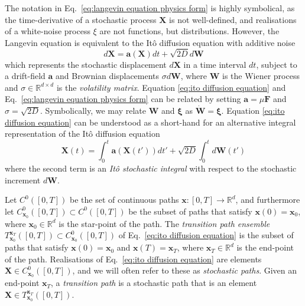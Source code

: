 The notation in Eq.~\ref{eq:langevin equation physics form} is highly symbolical, as the time-derivative of a stochastic process $\mathbf{X}$ is not well-defined, and realisations of a white-noise process $\xi$ are not functions, but distributions. However, the Langevin equation is equivalent to the It\^{o} diffusion equation with additive noise
\begin{equation} \label{eq:ito diffusion equation}
d \mathbf{X} = \mathbf{a}(\mathbf{X}) dt + \sqrt{2D} d \mathbf{W}
\end{equation}
which represents the stochastic displacement $d\mathbf{X}$ in a time
interval $dt$, subject to a drift-field $\mathbf{a}$ and Brownian displacements $\sigma d\mathbf{W}$, where $\mathbf{W}$ is the Wiener process and $\sigma \in \mathbb{R}^{d \times d}$ is the \textit{volatility matrix}. Equation \ref{eq:ito diffusion equation} and Eq.~\ref{eq:langevin equation physics form} can be related by setting $\mathbf{a} = \mu \mathbf{F}$ and $\sigma = \sqrt{2 D}$. Symbolically, we may relate $\mathbf{W}$ and $\boldsymbol{\xi}$ as $\dot{\mathbf{W}} = \boldsymbol{\xi}$. Equation \ref{eq:ito diffusion equation} can be understood as a short-hand for an alternative integral representation of the It\^{o} diffusion equation  
\begin{equation}
\mathbf{X}(t) = \int_0^t \mathbf{a}(\mathbf{X}(t')) dt' + \sqrt{2D} \int_0^{t} d \mathbf{W}(t')
\end{equation}
where the second term is an \textit{It\^{o} stochastic integral} \citep{oksendalStochasticDifferentialEquations2003, shreveStochasticCalculusFinance2005} with respect to the stochastic increment $d \mathbf{W}$.

Let $C^0([0,T])$ be the set of continuous paths $\mathbf{x} : [0, T] \to \mathbb{R}^d$, and furthermore let $C_{\mathbf{x}_0}^0([0,T]) \subset C^0([0,T])$ be the subset of paths that satisfy $\mathbf{x}(0) = \mathbf{x}_0$, where $\mathbf{x}_0 \in \mathbb{R}^d$ is the star-point of the path. The \textit{transition path ensemble} $T_{\mathbf{x}_0}^{\mathbf{x}_T}([0,T]) \subset C_{\mathbf{x}_0}^0([0,T])$ of Eq.~\ref{eq:ito diffusion equation} is the subset of paths that satisfy $\mathbf{x}(0) = \mathbf{x}_0$ and $\mathbf{x}(T) = \mathbf{x}_T$, where $\mathbf{x}_T \in \mathbb{R}^d$ is the end-point of the path. Realisations of Eq.~\ref{eq:ito diffusion equation} are elements $\mathbf{X} \in C_{\mathbf{x}_0}^0([0,T])$, and we will often refer to these as \textit{stochastic paths}. Given an end-point $\mathbf{x}_T$, a \textit{transition path} is a stochastic path that is an element $\mathbf{X} \in T_{\mathbf{x}_0}^{\mathbf{x}_T}([0,T])$.

